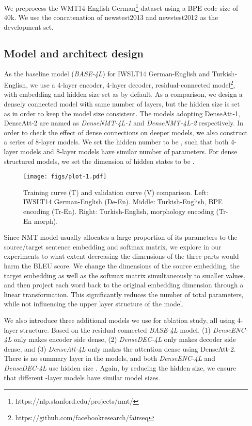 \documentclass[11pt,a4paper]{article}
\begin{document}
We preprocess the WMT14 English-German\footnote{https://nlp.stanford.edu/projects/nmt/} dataset using a BPE code size of 40k. 
We use the concatenation of newstest2013 and newstest2012 as the development set.





\subsection{Model and architect design}
As the baseline model (\emph{BASE-4L}) for IWSLT14 German-English and Turkish-English, we use a 4-layer encoder, 4-layer decoder, residual-connected model\footnote{https://github.com/facebookresearch/fairseq}, with embedding and hidden size set as  by default. 
As a comparison, we design a densely connected model with same number of layers, but the hidden size is set as  in order to keep the model size consistent. The models adopting DenseAtt-1, DenseAtt-2 are named as \emph{DenseNMT-4L-1} and \emph{DenseNMT-4L-2} respectively.
In order to check the effect of dense connections on deeper models, we also construct a series of 8-layer models. We set the hidden number to be , such that both 4-layer models and 8-layer models have similar number of parameters. 
For dense structured models, we set the dimension of hidden states to be . 

\begin{figure}[t]
\centering 
\captionsetup{font=small}
\texttt{[image: figs/plot-1.pdf]}
\caption{Training curve (T) and validation curve (V) comparison. Left: IWSLT14 German-English (De-En). Middle: Turkish-English, BPE encoding (Tr-En). Right: Turkish-English, morphology encoding (Tr-En-morph).}
\label{fig:curve-appendix}
\end{figure}


Since NMT model usually allocates a large proportion of its parameters to the  source/target sentence embedding and softmax matrix, we explore in our experiments to what extent decreasing the dimensions of the three parts would harm the BLEU score. 
We change the dimensions of the source embedding, the target embedding as well as the softmax matrix simultaneously to smaller values, and then project each word back to the original embedding dimension through a linear transformation. 
This significantly reduces the number of total parameters, while not influencing the upper layer structure of the model. 

We also introduce three additional models we use for ablation study, all using 4-layer structure. 
Based on the residual connected \emph{BASE-4L} model, (1) \emph{DenseENC-4L} only makes encoder side dense, (2) \emph{DenseDEC-4L} only makes decoder side dense, and (3) \emph{DenseAtt-4L} only makes the attention dense using DenseAtt-2. There is no summary layer in the models, and both \emph{DenseENC-4L} and \emph{DenseDEC-4L} use hidden size . Again, by reducing the hidden size, we ensure that different -layer models have similar model sizes. 
\end{document}
